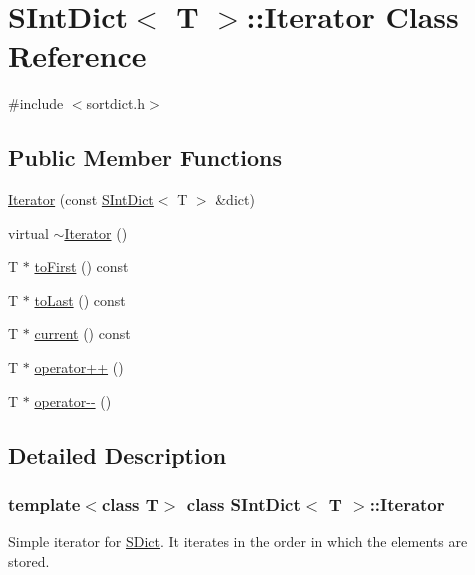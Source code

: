 \hypertarget{class_s_int_dict_1_1_iterator}{}\section{S\+Int\+Dict$<$ T $>$\+::Iterator Class Reference}
\label{class_s_int_dict_1_1_iterator}


{\ttfamily \#include $<$sortdict.\+h$>$}

\subsection*{Public Member Functions}
\begin{DoxyCompactItemize}
\item 
\mbox{\hyperlink{class_s_int_dict_1_1_iterator_ae83e1143c2b3533c2becdd4c4ad5838b}{Iterator}} (const \mbox{\hyperlink{class_s_int_dict}{S\+Int\+Dict}}$<$ T $>$ \&dict)
\item 
virtual \mbox{\hyperlink{class_s_int_dict_1_1_iterator_a1cbe8bd97e0ad5064bbc14ce273931ee}{$\sim$\+Iterator}} ()
\item 
T $\ast$ \mbox{\hyperlink{class_s_int_dict_1_1_iterator_ac77b3f93a0c4f47efdf231c0a5167a02}{to\+First}} () const
\item 
T $\ast$ \mbox{\hyperlink{class_s_int_dict_1_1_iterator_ae999652fa13a88d029bbeb9ce1887dc4}{to\+Last}} () const
\item 
T $\ast$ \mbox{\hyperlink{class_s_int_dict_1_1_iterator_a8ea5e9661491f570ebf15ba7f7f89a74}{current}} () const
\item 
T $\ast$ \mbox{\hyperlink{class_s_int_dict_1_1_iterator_adefe5ae758222ef7519636012292fd40}{operator++}} ()
\item 
T $\ast$ \mbox{\hyperlink{class_s_int_dict_1_1_iterator_a9c0a5a230cfd2418781e9e837534c651}{operator-\/-\/}} ()
\end{DoxyCompactItemize}


\subsection{Detailed Description}
\subsubsection*{template$<$class T$>$\newline
class S\+Int\+Dict$<$ T $>$\+::\+Iterator}

Simple iterator for \mbox{\hyperlink{class_s_dict}{S\+Dict}}. It iterates in the order in which the elements are stored. 

